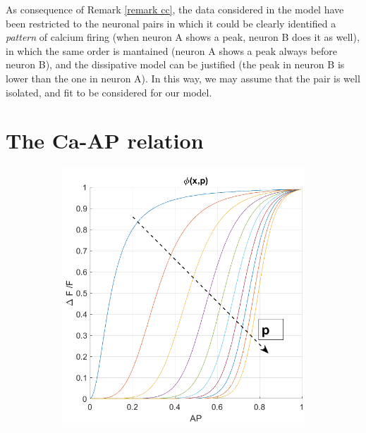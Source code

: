 \documentclass[12pt, a4paper]{report}
\begin{document}
As consequence of Remark \ref{remark cc}, the data considered in the model have been restricted to the neuronal pairs in which it could be clearly identified a \textit{pattern} of calcium firing (when neuron A shows a peak, neuron B does it as well), in which the same order is mantained (neuron A shows a peak always before neuron B), and the dissipative model can be justified (the peak in neuron B is lower than the one in neuron A). In this way, we may assume that the pair is well isolated, and fit to be considered for our model.

\section{The Ca-AP relation}


\begin{figure}[H]
	\begin{minipage}{\linewidth}
		\centering
		\begin{minipage}{0.45\linewidth}
			\begin{figure}[H]
				\includegraphics[width=\linewidth]{phi.png}
				

\end{figure}
\end{minipage}
\end{minipage}
\end{figure}
\end{document}

